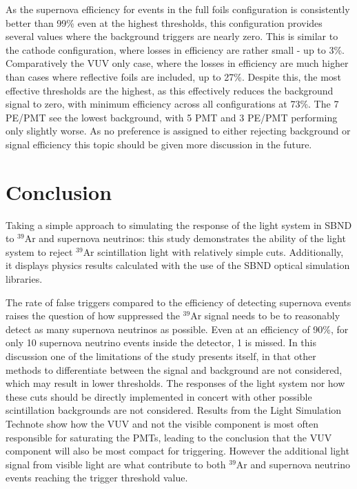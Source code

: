 \documentclass[a4paper]{article}
\begin{document}
As the supernova efficiency for events in the full foils configuration is consistently better than 99\% even at the highest thresholds, this configuration provides several values where the background triggers are nearly zero. This is similar to the cathode configuration, where losses in efficiency are rather small - up to 3\%. Comparatively the VUV only case, where the losses in efficiency are much higher than cases where reflective foils are included, up to 27\%. Despite this, the most effective thresholds are the highest, as this effectively reduces the background signal to zero, with minimum efficiency across all configurations at 73\%. The 7 PE/PMT see the lowest background, with 5 PMT and 3  PE/PMT performing only slightly worse. As no preference is assigned to either rejecting background or signal efficiency this topic should be given more discussion in the future.


\section{Conclusion}\label{ar39_conclusion}

Taking a simple approach to simulating the response of the light system in SBND to $^{39}$Ar and supernova neutrinos: this study demonstrates the ability of the light system to reject $^{39}$Ar scintillation light with relatively simple cuts. Additionally, it displays physics results calculated with the use of the SBND optical simulation libraries.

The rate of false triggers compared to the efficiency of detecting supernova events raises the question of how suppressed the $^{39}$Ar signal needs to be to reasonably detect as many supernova neutrinos as possible. Even at an efficiency of 90\%, for only 10 supernova neutrino events inside the detector, 1 is missed. In this discussion one of the limitations of the study presents itself, in that other methods to differentiate between the signal and background are not considered, which may result in lower thresholds.  The responses of the light system nor how these cuts should be directly implemented in concert with other possible scintillation backgrounds are not considered. Results from the Light Simulation Technote \cite{light_sim_technote} show how the VUV and not the visible component is most often responsible for saturating the PMTs, leading to the conclusion that the VUV component will also be most compact for triggering. However the additional light signal from visible light are what contribute to both $^{39}$Ar and supernova neutrino events reaching the trigger threshold value.
\end{document}
